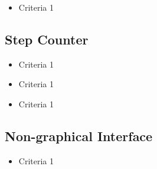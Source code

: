 { }
{\begin{itemize}
\item Criteria 1
\end{itemize}}



\subsection{Step Counter}
{ }
{\begin{itemize}
\item Criteria 1
\end{itemize}}

{ }
{\begin{itemize}
\item Criteria 1
\end{itemize}}

{ }
{\begin{itemize}
\item Criteria 1
\end{itemize}}



\subsection{Non-graphical Interface}
{ }
{\begin{itemize}
\item Criteria 1
\end{itemize}}